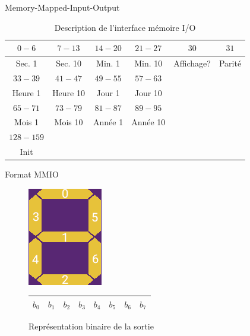 \documentclass[intlimits, 10pt]{beamer}
\begin{document}
	\begin{frame}{Memory-Mapped-Input-Output}
		\begin{table}
			\begin{tabular}{|c|c|c|c|c|c|}
				\hline
				$0-6$ & $7-13$ & $14-20$ & $21-27$ & $30$ & $31$ \\ 
				\hline
				Sec. 1 & Sec. 10 & Min. 1 & Min. 10 & Affichage? & Parité \\
				\hline
				\hline
				$33-39$ &$41-47$&$49-55$ &$57-63$ && \\
				\hline
				Heure 1 & Heure 10 & Jour 1 & Jour 10 &&\\
				\hline
				\hline
				$65-71$ & $73-79$ & $81-87$ & $89-95$ &&\\
				\hline
				Mois 1 & Mois 10 & Année 1 & Année 10 &&\\
				\hline
				\hline
				$128-159$ &&&&&\\
				\hline
				Init &&&&& \\
				\hline
			\end{tabular}
			\caption{Description de l'interface mémoire I/O}
		\end{table}
	\end{frame}
	
	\begin{frame}{Format MMIO}
		
		\begin{figure}
			\centering
			\includegraphics[width=0.3\linewidth]{../Rapport/segments}
			
			\begin{tabular}{|c|c|c|c|c|c|c|c|}
				\hline
				$b_0$& $b_1$  & $b_2$ & $b_3$ & $b_4$ & $b_5$ & $b_6$ & $b_7$ \\
				\hline
			\end{tabular}
			\caption{Représentation binaire de la sortie}
			\label{fig:segments}
		\end{figure}
		
		

	\end{frame}
	
\end{document}

